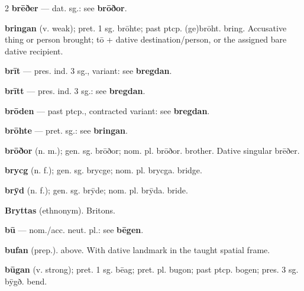\begin{multicols*}{2}
\textbf{brēðer} — dat. sg.: see \textbf{brōðor}.\par
\textbf{bringan} (v. weak); pret. 1 sg. brōhte; past ptcp. (ge)brōht. bring. Accusative thing or person brought; tō + dative destination/person, or the assigned bare dative recipient.\par
\textbf{brīt} — pres. ind. 3 sg., variant: see \textbf{bregdan}.\par
\textbf{brītt} — pres. ind. 3 sg.: see \textbf{bregdan}.\par
\textbf{brōden} — past ptcp., contracted variant: see \textbf{bregdan}.\par
\textbf{brōhte} — pret. sg.: see \textbf{bringan}.\par
\textbf{brōðor} (n. m.); gen. sg. brōðor; nom. pl. brōðor. brother. Dative singular brēðer.\par
\textbf{brycg} (n. f.); gen. sg. brycge; nom. pl. brycga. bridge.\par
\textbf{brȳd} (n. f.); gen. sg. brȳde; nom. pl. brȳda. bride.\par
\textbf{Bryttas} (ethnonym). Britons.\par
\textbf{bū} — nom./acc. neut. pl.: see \textbf{bēgen}.\par
\textbf{bufan} (prep.). above. With dative landmark in the taught spatial frame.\par
\textbf{būgan} (v. strong); pret. 1 sg. bēag; pret. pl. bugon; past ptcp. bogen; pres. 3 sg. bȳgð. bend.\par

\end{multicols*}

